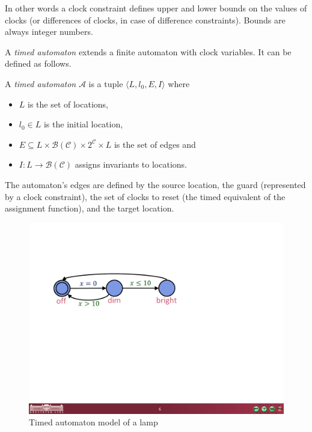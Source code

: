In other words a clock constraint defines upper and lower bounds on the values of clocks (or differences of clocks, in case of difference constraints). Bounds are always integer numbers.

A \emph{timed automaton} extends a finite automaton with clock variables. It can be defined as follows.

\begin{dfn}
A \emph{timed automaton} $\mathcal{A}$ is a tuple $\langle L, l_0,
E, I\rangle$ where
\begin{itemize}
	\item $L$ is the set of locations,
	\item $l_0 \in L$ is the initial location,
	\item $E \subseteq L \times \mathcal{B}(\mathcal{C}) \times 2^\mathcal{C} \times L$ is the set of edges and
	\item $I: L \to \mathcal{B}(\mathcal{C})$ assigns invariants to locations. \cite{bengtsson2004timed}
\end{itemize}
\end{dfn}

The automaton's edges are defined by the source location, the guard (represented by a clock constraint), the set of clocks to reset (the timed equivalent of the assignment function), and the target location.

\begin{figure}
	\centering
	\begin{minipage}{0.5\textwidth}
		\includegraphics[width=\textwidth]{include/figures/timed_lamp}%
		\caption{Timed automaton model of a lamp}
		\label{fig:lamp}
	\end{minipage}
\end{figure}

